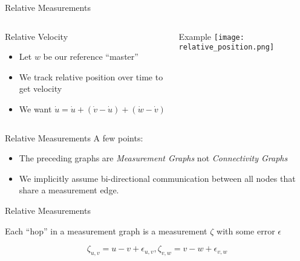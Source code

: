 \documentclass{beamer}
\begin{document}
\begin{frame}{Relative Measurements}
  \begin{columns}[T]
    \begin{column}{.5\textwidth}
     \begin{block}{Relative Velocity}
        \begin{itemize}
            \item Let $w$ be our reference ``master''
            \item We track relative position over time to get velocity
            \item We want $\dot{u} = \dot{u} + (\dot{v} - \dot{u}) + (\dot{w} -
            \dot{v})$ 
        \end{itemize}
    \end{block}
    \end{column}
    \begin{column}{.5\textwidth}
    \begin{block}{Example}
    \texttt{[image: relative\_position.png]}
    \end{block}
    \end{column}
  \end{columns}
\end{frame}

\begin{frame}{Relative Measurements}
A few points:
\begin{itemize}
\item The preceding graphs are \emph{Measurement Graphs} not \emph{Connectivity
Graphs}
\item We implicitly assume bi-directional communication between all nodes that
share a measurement edge. 
\end{itemize}
\end{frame}

\begin{frame}{Relative Measurements}
\begin{center}
Each ``hop'' in a measurement graph is a measurement $\zeta$ with some error
$\epsilon$
\begin{figure}
\end{figure}
\[ \zeta_{u,v} = u - v + \epsilon_{u,v}, \zeta_{v,w} = v - w + \epsilon_{v,w} \]
\end{center}
\end{frame}
\end{document}
